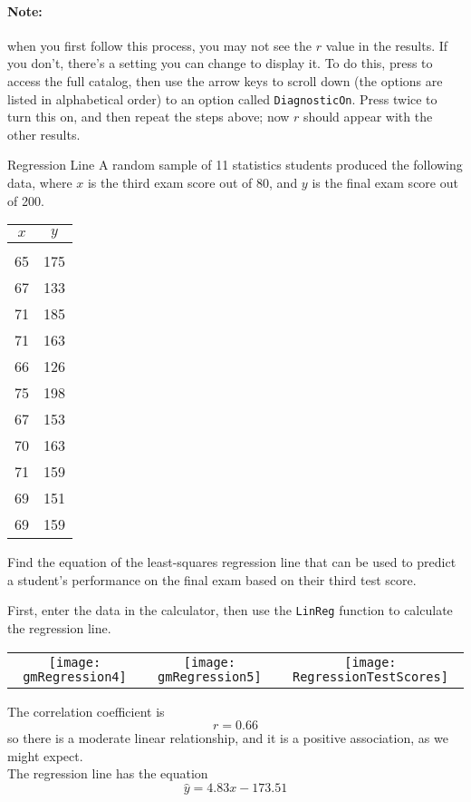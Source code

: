 \paragraph{Note:} when you first follow this process, you may not see the $r$ value in the results.  If you don't, there's a setting you can change to display it.  To do this, press   to access the full catalog, then use the arrow keys to scroll down (the options are listed in alphabetical order) to an option called \texttt{DiagnosticOn}.  Press  twice to turn this on, and then repeat the steps above; now $r$ should appear with the other results.
\pagebreak

\begin{example}{Regression Line}
A random sample of 11 statistics students produced the following data, where $x$ is the third exam score out of 80, and $y$ is the final exam score out of 200.
\begin{center}
\begin{tabular}{c c}
$x$ & $y$\\
\hline
\\
65 & 175\\
67 & 133\\
71 & 185\\
71 & 163\\
66 & 126\\
75 & 198\\
67 & 153\\
70 & 163\\
71 & 159\\
69 & 151\\
69 & 159
\end{tabular}
\end{center}

Find the equation of the least-squares regression line that can be used to predict a student's performance on the final exam based on their third test score.

\sol
First, enter the data in the calculator, then use the \texttt{LinReg} function to calculate the regression line.
\begin{center}
\begin{tabular}{c c c}
\texttt{[image: gmRegression4]}
& \texttt{[image: gmRegression5]}
& \texttt{[image: RegressionTestScores]}
\end{tabular}
\end{center}

The correlation coefficient is
\[\boxed{r = 0.66}\]
so there is a moderate linear relationship, and it is a positive association, as we might expect.\\

The regression line has the equation
\[\boxed{\hat{y} = 4.83x-173.51}\]
\end{example}

